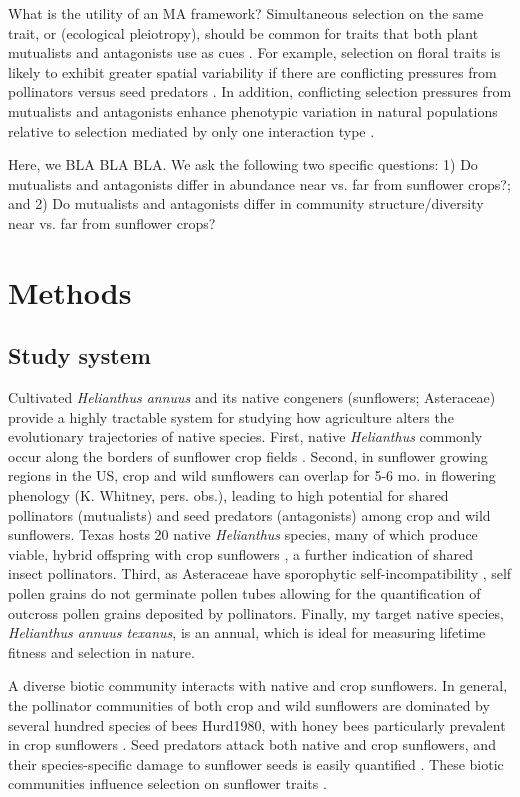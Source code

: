 \documentclass[12pt]{article}
\begin{document}
What is the utility of an MA framework?  Simultaneous selection on the same trait, or (ecological pleiotropy), should be common for traits that both plant mutualists and antagonists use as cues \citep{Strauss2004}. For example, selection on floral traits is likely to exhibit greater spatial variability if there are conflicting pressures from pollinators versus seed predators \citep[e.g., ][]{Cariveau2004}. In addition, conflicting selection pressures from mutualists and antagonists enhance phenotypic variation in natural populations relative to selection mediated by only one interaction type \citep{Irwin2003,Siepielski2010}.

Here, we BLA BLA BLA. We ask the following two specific questions: 1) Do mutualists and antagonists differ in abundance near vs. far from sunflower crops?; and 2) Do mutualists and antagonists differ in community structure/diversity near vs. far from sunflower crops?

\section{Methods}
\subsection{Study system}
Cultivated \textit{Helianthus annuus} and its native congeners (sunflowers; Asteraceae) provide a highly tractable system for studying how agriculture alters the evolutionary trajectories of native species.  First, native \textit{Helianthus} commonly occur along the borders of sunflower crop fields \citep{Burke2002}.  Second, in sunflower growing regions in the US, crop and wild sunflowers can overlap for 5-6 mo. in flowering phenology (K. Whitney, pers. obs.), leading to high potential for shared pollinators (mutualists) and seed predators (antagonists) among crop and wild sunflowers. Texas hosts 20 native \textit{Helianthus} species, many of which produce viable, hybrid offspring with crop sunflowers \citep{Whitton1997,Linder1998}, a further indication of shared insect pollinators. Third, as Asteraceae have sporophytic self-incompatibility \citep{Linder1998}, self pollen grains do not germinate pollen tubes allowing for the quantification of outcross pollen grains deposited by pollinators. Finally, my target native species, \textit{Helianthus annuus texanus}, is an annual, which is ideal for measuring lifetime fitness and selection in nature. 

A diverse biotic community interacts with native and crop sunflowers. In general, the pollinator communities of both crop and wild sunflowers are dominated by several hundred species of bees Hurd1980, with honey bees particularly prevalent in crop sunflowers \cite{Greenleaf2006}. Seed predators attack both native and crop sunflowers, and their species-specific damage to sunflower seeds is easily quantified \citep{Whitney2006}. These biotic communities influence selection on sunflower traits \citep{Whitney2006}.
\end{document}
